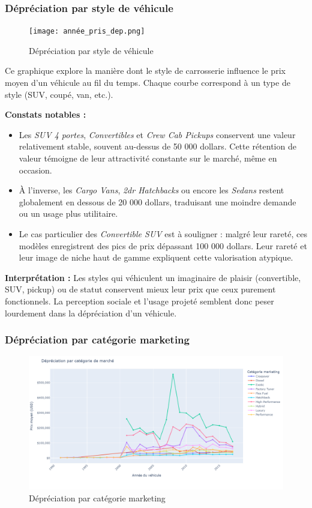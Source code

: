 \documentclass[12pt]{report}
\begin{document}
\subsubsection{Dépréciation par style de véhicule}
\begin{figure}[H] \centering \texttt{[image: année\_pris\_dep.png]} \caption{Dépréciation par style de véhicule} \label{fig:annee-pris-dep} \end{figure}

Ce graphique explore la manière dont le style de carrosserie influence le prix moyen d’un véhicule au fil du temps. Chaque courbe correspond à un type de style (SUV, coupé, van, etc.).

\textbf{Constats notables :} \begin{itemize} \item Les \textit{SUV 4 portes}, \textit{Convertibles} et \textit{Crew Cab Pickups} conservent une valeur relativement stable, souvent au-dessus de 50 000 dollars. Cette rétention de valeur témoigne de leur attractivité constante sur le marché, même en occasion. \item À l’inverse, les \textit{Cargo Vans}, \textit{2dr Hatchbacks} ou encore les \textit{Sedans} restent globalement en dessous de 20 000 dollars, traduisant une moindre demande ou un usage plus utilitaire. \item Le cas particulier des \textit{Convertible SUV} est à souligner : malgré leur rareté, ces modèles enregistrent des pics de prix dépassant 100 000 dollars. Leur rareté et leur image de niche haut de gamme expliquent cette valorisation atypique. \end{itemize}

\textbf{Interprétation :}
Les styles qui véhiculent un imaginaire de plaisir (convertible, SUV, pickup) ou de statut conservent mieux leur prix que ceux purement fonctionnels. La perception sociale et l'usage projeté semblent donc peser lourdement dans la dépréciation d’un véhicule.

\subsubsection{Dépréciation par catégorie marketing}
\begin{figure}[H] \centering \includegraphics[width=1\textwidth]{annee_prix_cat.png} \caption{Dépréciation par catégorie marketing} \label{fig:annee-prix-cat} \end{figure}
\end{document}
